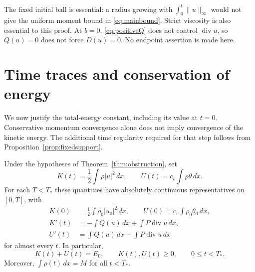 \documentclass[10pt,twoside]{article}
\newcommand{\dd}{\,dx}
\newcommand{\Div}{\operatorname{div}}
\newcommand{\norm}[2]{\lVert#1\rVert_{#2}}
\begin{document}
The fixed initial ball is essential: a radius growing with
$\int_0^t\norm{u}{\infty}$ would not give the uniform moment bound
in \eqref{eq:mainbound}. Strict viscosity is also essential to
this proof. At $b=0$, \eqref{eq:positiveQ} does not control
$\Div u$, so $Q(u)=0$ does not force $D(u)=0$. No endpoint
assertion is made here.

\section{Time traces and conservation of energy}\label{sec:energy}

We now justify the total-energy constant, including its value at
$t=0$. Conservative momentum convergence alone does not imply
convergence of the kinetic energy. The additional time regularity
required for that step follows from Proposition~\ref{prop:fixedsupport}.

\begin{proposition}\label{prop:energy}
Under the hypotheses of Theorem~\ref{thm:obstruction}, set
\[
 K(t)=\frac12\int\rho|u|^2\dd,\qquad
 U(t)=c_v\int\rho\theta\dd.
\]
For each $T<T_*$ these quantities have absolutely continuous
representatives on $[0,T]$, with
\begin{equation}
 \begin{aligned}
 K(0)&=\frac12\int\rho_0|u_0|^2\dd,\qquad
 U(0)=c_v\int\rho_0\theta_0\dd,\\
 K'(t)&=-\int Q(u)\dd+\int P\Div u\dd,\\
 U'(t)&=\int Q(u)\dd-\int P\Div u\dd
 \end{aligned}\label{eq:energyidentities}
\end{equation}
for almost every $t$. In particular,
\begin{equation}
 K(t)+U(t)=E_0,\qquad K(t),U(t)\ge0,\qquad 0\le t<T_*.
 \label{eq:energyconservation}
\end{equation}
Moreover, $\int\rho(t)\dd=M$ for all $t<T_*$.
\end{proposition}
\end{document}
